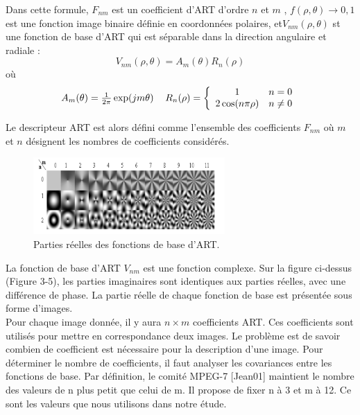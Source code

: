 Dans cette formule, $ F_{nm} $ est un coefficient d’ART d’ordre $ n $ et $ m $ , $ f(\rho, \theta) \longrightarrow {0,1} $ est une fonction image binaire définie en coordonnées polaires, et$  V_{nm}(\rho, \theta) $ st une fonction de base d’ART qui est séparable dans la direction angulaire et radiale :
\begin{equation}
	V_{nm}(\rho, \theta)= A_m(\theta) R_n(\rho) 
\end{equation}
où
\begin{equation}
\begin{tabular}{cc}
 $ A_m(\theta) =\frac{1}{2\pi}\exp(jm\theta) $ 
    & $ R_n(\rho) = \left\{
    \begin{array}{cc} 
    1 & n=0 \\ 2\cos( n \pi \rho) 
    & n \neq 0  \end{array} \right. $ 
\end{tabular}
\end{equation}

Le descripteur ART est alors défini comme l’ensemble des coefficients $ F_{nm} $ où $ m $ et $ n $ désignent les nombres de coefficients considérés.

 \begin{figure}[H]
	\label{fig:art}
	\centering
	\includegraphics[width=0.65\textwidth]{Figures/art} %
	
	\caption{Parties réelles des fonctions de base d’ART.}
	
\end{figure}

La fonction de base d’ART $ V_{nm} $ est une fonction complexe. Sur la figure ci-dessus (Figure 3-5), les parties imaginaires sont identiques aux parties réelles, avec une différence de phase. La partie réelle de chaque fonction de base est présentée sous forme d’images.\\

Pour chaque image donnée, il y aura $ n \times m $  coefficients ART. Ces coefficients sont utilisés pour mettre en correspondance deux images. Le problème est de savoir combien de coefficient est nécessaire pour la description d’une image. Pour déterminer le nombre de coefficients, il faut analyser les covariances entre les fonctions de base. Par définition, le comité MPEG-7 [Jean01] maintient le nombre des valeurs de n plus petit que celui de m. Il propose de fixer n à 3 et m à 12. Ce sont les valeurs que nous utilisons dans notre étude.\\


